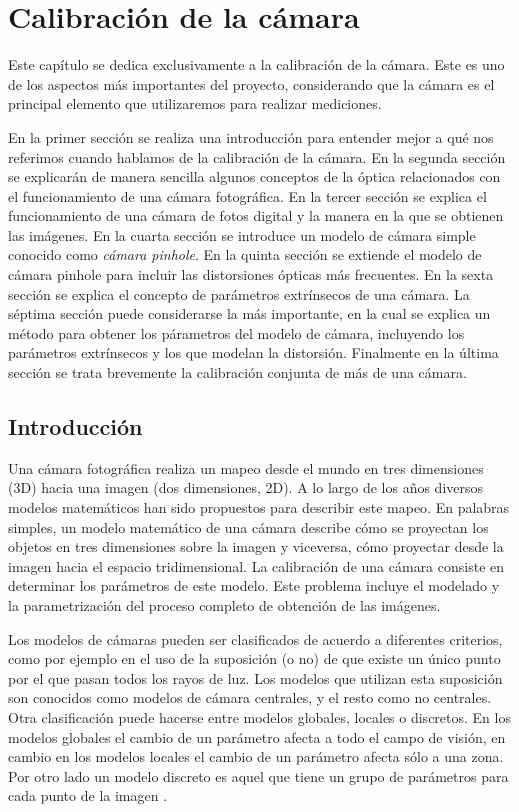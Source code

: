 \chapter{Calibración de la cámara}\label{ch:calibracion}

Este capítulo se dedica exclusivamente a la calibración de la cámara. Este es uno de los aspectos más importantes del proyecto, considerando que la cámara es el principal elemento que utilizaremos para realizar mediciones.

En la primer sección se realiza una introducción para entender mejor a qué nos referimos cuando hablamos de la calibración de la cámara. 
En la segunda sección se explicarán de manera sencilla algunos conceptos de la óptica relacionados con el funcionamiento de una cámara fotográfica.
En la tercer sección se explica el funcionamiento de una cámara de fotos digital y la manera en la que se obtienen las imágenes.
En la cuarta sección se introduce un modelo de cámara simple conocido como \emph{cámara pinhole}.
En la quinta sección se extiende el modelo de cámara pinhole para incluir las distorsiones ópticas más frecuentes.
En la sexta sección se explica el concepto de parámetros extrínsecos de una cámara.
La séptima sección puede considerarse la más importante, en la cual se explica un método para obtener los párametros del modelo de cámara, incluyendo los parámetros extrínsecos y los que modelan la distorsión.
Finalmente en la última sección se trata brevemente la calibración conjunta de más de una cámara.

\section{Introducción}\label{sec:calibracion_intro}
Una cámara fotográfica realiza un mapeo desde el mundo en tres dimensiones (3D) hacia una imagen (dos dimensiones, 2D). A lo largo de los años diversos modelos matemáticos han sido propuestos para describir este mapeo. En palabras simples, un modelo matemático de una cámara describe cómo se proyectan los objetos en tres dimensiones sobre la imagen y viceversa, cómo proyectar desde la imagen hacia el espacio tridimensional. La calibración de una cámara consiste en determinar los parámetros de este modelo. Este problema incluye el modelado y la parametrización del proceso completo de obtención de las imágenes.

Los modelos de cámaras pueden ser clasificados de acuerdo a diferentes criterios, como por ejemplo en el uso de la suposición (o no) de que existe un único punto por el que pasan todos los rayos de luz. Los modelos que utilizan esta suposición son conocidos como modelos de cámara centrales, y el resto como no centrales. Otra clasificación puede hacerse entre modelos globales, locales o discretos. En los modelos globales el cambio de un parámetro afecta a todo el campo de visión, en cambio en los modelos locales el cambio de un parámetro afecta sólo a una zona. Por otro lado un modelo discreto es aquel que tiene un grupo de parámetros para cada punto de la imagen \cite{sturm2011camera}.

